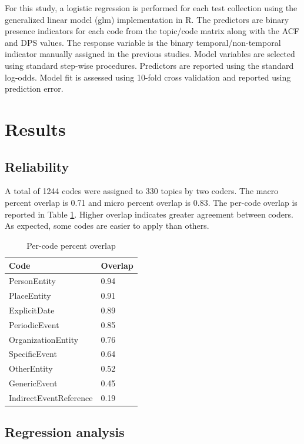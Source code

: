 \documentclass{sig-alternate}
\begin{document}
For this study, a logistic regression is performed for each test collection using the generalized linear model (glm) implementation in R. The predictors are binary presence indicators for each code from the topic/code matrix along with the ACF and DPS values. The response variable is the binary temporal/non-temporal indicator manually assigned in the previous studies. Model variables are selected using standard step-wise procedures. Predictors are reported using the standard log-odds. Model fit is assessed using 10-fold cross validation and reported using prediction error.


\section{Results}

\subsection{Reliability}

A total of 1244 codes were assigned to 330 topics by two coders.  The macro percent overlap is 0.71 and  micro percent overlap is 0.83.  The per-code overlap is reported in Table \ref{table.overlap}.  Higher overlap indicates greater agreement between coders. As expected, some codes are easier to apply than others.

\begin{table}
\small
\begin{tabular}{| l | l |} \hline
\bf{Code} & \bf{Overlap}  \\ \hline
PersonEntity & 0.94  \\ \hline
PlaceEntity  & 0.91  \\ \hline
ExplicitDate & 0.89   \\ \hline
PeriodicEvent & 0.85   \\ \hline
OrganizationEntity & 0.76  \\ \hline
SpecificEvent & 0.64  \\ \hline
OtherEntity & 0.52  \\ \hline
GenericEvent & 0.45  \\ \hline
IndirectEventReference & 0.19  \\ \hline
\end{tabular}
\caption{Per-code percent overlap }
\label{table.overlap}
\end{table}

\subsection{Regression analysis}
\end{document}
